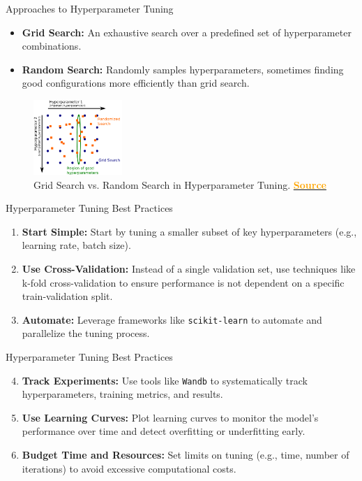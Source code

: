 \documentclass[serif, aspectratio=169]{beamer}
\begin{document}
\begin{frame}{Approaches to Hyperparameter Tuning}
    \begin{itemize}
        \item \textbf{Grid Search:} An exhaustive search over a predefined set of hyperparameter combinations.
        \item \textbf{Random Search:} Randomly samples hyperparameters, sometimes finding good configurations more efficiently than grid search.
    \end{itemize}
    \begin{figure}
        \centering
        \includegraphics[width=0.3\textwidth]{pic/grid_vs_random_search.png}
        \caption{Grid Search vs. Random Search in Hyperparameter Tuning. \href{https://inria.github.io/scikit-learn-mooc/_images/grid_vs_random_search.svg}{\textcolor{orange}{\textbf{Source}}}}
        \label{fig:hyperparameter_tuning}
    \end{figure}
\end{frame}

\begin{frame}{Hyperparameter Tuning Best Practices}
    \begin{enumerate}
        \item \textbf{Start Simple:} Start by tuning a smaller subset of key hyperparameters (e.g., learning rate, batch size).
        \item \textbf{Use Cross-Validation:} Instead of a single validation set, use techniques like k-fold cross-validation to ensure performance is not dependent on a specific train-validation split.
        \item \textbf{Automate:} Leverage frameworks like \texttt{scikit-learn} to automate and parallelize the tuning process.
    \end{enumerate}
\end{frame}

\begin{frame}{Hyperparameter Tuning Best Practices}
    \begin{enumerate}
        \setcounter{enumi}{3}
        \item \textbf{Track Experiments:} Use tools like \texttt{Wandb} to systematically track hyperparameters, training metrics, and results.
        \item \textbf{Use Learning Curves:} Plot learning curves to monitor the model's performance over time and detect overfitting or underfitting early.
        \item \textbf{Budget Time and Resources:} Set limits on tuning (e.g., time, number of iterations) to avoid excessive computational costs.
    \end{enumerate}
\end{frame}
\end{document}
